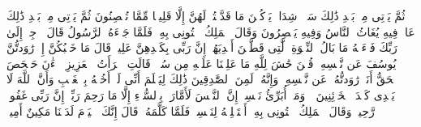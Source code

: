 ثُمَّ یَأۡتِی مِنۢ بَعۡدِ ذَٰلِكَ سَبۡعࣱ شِدَادࣱ یَأۡكُلۡنَ مَا قَدَّمۡتُمۡ لَهُنَّ إِلَّا قَلِیلࣰا مِّمَّا تُحۡصِنُونَ%
\stopbuffer%
\startbuffer[\q:12:49]
ثُمَّ یَأۡتِی مِنۢ بَعۡدِ ذَٰلِكَ عَامࣱ فِیهِ یُغَاثُ ٱلنَّاسُ وَفِیهِ یَعۡصِرُونَ%
\stopbuffer%
\startbuffer[\q:12:50]
وَقَالَ ٱلۡمَلِكُ ٱئۡتُونِی بِهِۦۖ فَلَمَّا جَاۤءَهُ ٱلرَّسُولُ قَالَ ٱرۡجِعۡ إِلَىٰ رَبِّكَ فَسۡءَلۡهُ مَا بَالُ ٱلنِّسۡوَةِ ٱلَّٰتِی قَطَّعۡنَ أَیۡدِیَهُنَّۚ إِنَّ رَبِّی بِكَیۡدِهِنَّ عَلِیمࣱ%
\stopbuffer%
\startbuffer[\q:12:51]
قَالَ مَا خَطۡبُكُنَّ إِذۡ رَٰوَدتُّنَّ یُوسُفَ عَن نَّفۡسِهِۦۚ قُلۡنَ حَٰشَ لِلَّهِ مَا عَلِمۡنَا عَلَیۡهِ مِن سُوۤءࣲۚ قَالَتِ ٱمۡرَأَتُ ٱلۡعَزِیزِ ٱلۡءَٰنَ حَصۡحَصَ ٱلۡحَقُّ أَنَا۠ رَٰوَدتُّهُۥ عَن نَّفۡسِهِۦ وَإِنَّهُۥ لَمِنَ ٱلصَّٰدِقِینَ%
\stopbuffer%
\startbuffer[\q:12:52]
ذَٰلِكَ لِیَعۡلَمَ أَنِّی لَمۡ أَخُنۡهُ بِٱلۡغَیۡبِ وَأَنَّ ٱللَّهَ لَا یَهۡدِی كَیۡدَ ٱلۡخَاۤئِنِینَ%
\stopbuffer%
\startbuffer[\q:12:53]
۞ وَمَاۤ أُبَرِّئُ نَفۡسِیۤۚ إِنَّ ٱلنَّفۡسَ لَأَمَّارَةُۢ بِٱلسُّوۤءِ إِلَّا مَا رَحِمَ رَبِّیۤۚ إِنَّ رَبِّی غَفُورࣱ رَّحِیمࣱ%
\stopbuffer%
\startbuffer[\q:12:54]
وَقَالَ ٱلۡمَلِكُ ٱئۡتُونِی بِهِۦۤ أَسۡتَخۡلِصۡهُ لِنَفۡسِیۖ فَلَمَّا كَلَّمَهُۥ قَالَ إِنَّكَ ٱلۡیَوۡمَ لَدَیۡنَا مَكِینٌ أَمِینࣱ%
\stopbuffer%
